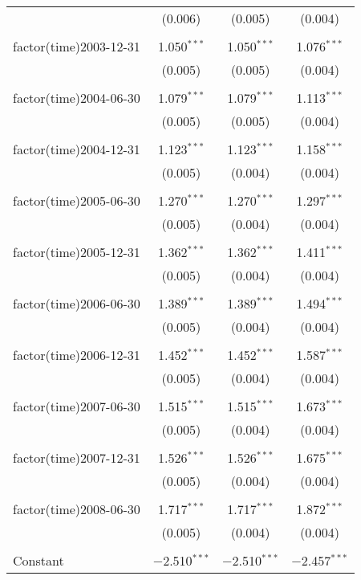 \begin{table}[!htbp]
\begin{tabular}{@{\extracolsep{5pt}}lccc}
  & (0.006) & (0.005) & (0.004) \\ 
  & & & \\ 
 factor(time)2003-12-31 & 1.050$^{***}$ & 1.050$^{***}$ & 1.076$^{***}$ \\ 
  & (0.005) & (0.005) & (0.004) \\ 
  & & & \\ 
 factor(time)2004-06-30 & 1.079$^{***}$ & 1.079$^{***}$ & 1.113$^{***}$ \\ 
  & (0.005) & (0.005) & (0.004) \\ 
  & & & \\ 
 factor(time)2004-12-31 & 1.123$^{***}$ & 1.123$^{***}$ & 1.158$^{***}$ \\ 
  & (0.005) & (0.004) & (0.004) \\ 
  & & & \\ 
 factor(time)2005-06-30 & 1.270$^{***}$ & 1.270$^{***}$ & 1.297$^{***}$ \\ 
  & (0.005) & (0.004) & (0.004) \\ 
  & & & \\ 
 factor(time)2005-12-31 & 1.362$^{***}$ & 1.362$^{***}$ & 1.411$^{***}$ \\ 
  & (0.005) & (0.004) & (0.004) \\ 
  & & & \\ 
 factor(time)2006-06-30 & 1.389$^{***}$ & 1.389$^{***}$ & 1.494$^{***}$ \\ 
  & (0.005) & (0.004) & (0.004) \\ 
  & & & \\ 
 factor(time)2006-12-31 & 1.452$^{***}$ & 1.452$^{***}$ & 1.587$^{***}$ \\ 
  & (0.005) & (0.004) & (0.004) \\ 
  & & & \\ 
 factor(time)2007-06-30 & 1.515$^{***}$ & 1.515$^{***}$ & 1.673$^{***}$ \\ 
  & (0.005) & (0.004) & (0.004) \\ 
  & & & \\ 
 factor(time)2007-12-31 & 1.526$^{***}$ & 1.526$^{***}$ & 1.675$^{***}$ \\ 
  & (0.005) & (0.004) & (0.004) \\ 
  & & & \\ 
 factor(time)2008-06-30 & 1.717$^{***}$ & 1.717$^{***}$ & 1.872$^{***}$ \\ 
  & (0.005) & (0.004) & (0.004) \\ 
  & & & \\ 
 Constant & $-$2.510$^{***}$ & $-$2.510$^{***}$ & $-$2.457$^{***}$ \\ 

\end{tabular}
\end{table}
